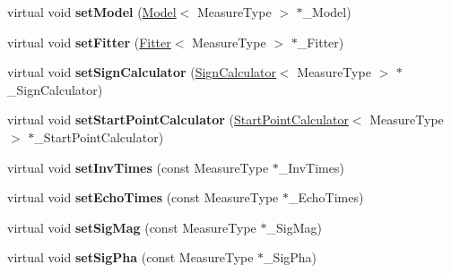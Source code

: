 \begin{DoxyCompactItemize}
\item 
virtual void {\bfseries set\+Model} (\hyperlink{class_ox_1_1_model}{Model}$<$ Measure\+Type $>$ $\ast$\+\_\+\+Model)\hypertarget{class_ox_1_1_calculator_ab814b8876ab6ddd7585f73dd23024624}{}\label{class_ox_1_1_calculator_ab814b8876ab6ddd7585f73dd23024624}

\item 
virtual void {\bfseries set\+Fitter} (\hyperlink{class_ox_1_1_fitter}{Fitter}$<$ Measure\+Type $>$ $\ast$\+\_\+\+Fitter)\hypertarget{class_ox_1_1_calculator_a65d901e63b2f59b77a7dea82eaaa8215}{}\label{class_ox_1_1_calculator_a65d901e63b2f59b77a7dea82eaaa8215}

\item 
virtual void {\bfseries set\+Sign\+Calculator} (\hyperlink{class_ox_1_1_sign_calculator}{Sign\+Calculator}$<$ Measure\+Type $>$ $\ast$\+\_\+\+Sign\+Calculator)\hypertarget{class_ox_1_1_calculator_a9b29545ec9a0e911217f496f7d539471}{}\label{class_ox_1_1_calculator_a9b29545ec9a0e911217f496f7d539471}

\item 
virtual void {\bfseries set\+Start\+Point\+Calculator} (\hyperlink{class_ox_1_1_start_point_calculator}{Start\+Point\+Calculator}$<$ Measure\+Type $>$ $\ast$\+\_\+\+Start\+Point\+Calculator)\hypertarget{class_ox_1_1_calculator_a1ea380bc76e9cd19f0a04254ae167230}{}\label{class_ox_1_1_calculator_a1ea380bc76e9cd19f0a04254ae167230}

\item 
virtual void {\bfseries set\+Inv\+Times} (const Measure\+Type $\ast$\+\_\+\+Inv\+Times)\hypertarget{class_ox_1_1_calculator_a1dcb241d551a06436108a9f4bf916ece}{}\label{class_ox_1_1_calculator_a1dcb241d551a06436108a9f4bf916ece}

\item 
virtual void {\bfseries set\+Echo\+Times} (const Measure\+Type $\ast$\+\_\+\+Echo\+Times)\hypertarget{class_ox_1_1_calculator_aaf50e9d3fae8e95ff981bf15e17bba28}{}\label{class_ox_1_1_calculator_aaf50e9d3fae8e95ff981bf15e17bba28}

\item 
virtual void {\bfseries set\+Sig\+Mag} (const Measure\+Type $\ast$\+\_\+\+Sig\+Mag)\hypertarget{class_ox_1_1_calculator_a51fb95a1a68b1e14b659761c1f64aaab}{}\label{class_ox_1_1_calculator_a51fb95a1a68b1e14b659761c1f64aaab}

\item 
virtual void {\bfseries set\+Sig\+Pha} (const Measure\+Type $\ast$\+\_\+\+Sig\+Pha)\hypertarget{class_ox_1_1_calculator_a7b753dac0897ee4a5cb9c4d7a21d0926}{}\label{class_ox_1_1_calculator_a7b753dac0897ee4a5cb9c4d7a21d0926}


\end{DoxyCompactItemize}
